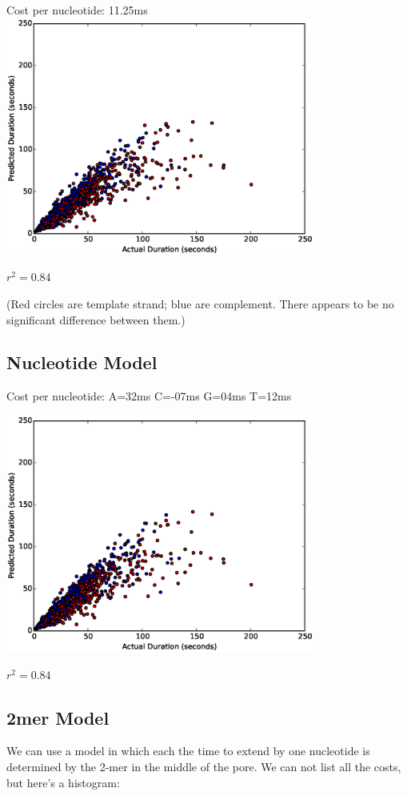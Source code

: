 \documentclass[11pt]{article}
\begin{document}
Cost per nucleotide: 11.25ms\\
\includegraphics[width=4in]{part11scatter0mer}

$r^2=0.84$


(Red circles are template strand; blue are complement.  There appears to be no significant difference between them.)

\subsection*{Nucleotide Model}
Cost per nucleotide: 
A=32ms 
C=-07ms 
G=04ms 
T=12ms 


\includegraphics[width=4in]{part11scatter1mer}

$r^2=0.84$

\subsection*{2mer Model}

        We can use a model in which each the time to extend by one nucleotide is determined by the 2-mer in the middle of the
        pore.  We can not list all the costs, but here's a histogram:
        
\end{document}

